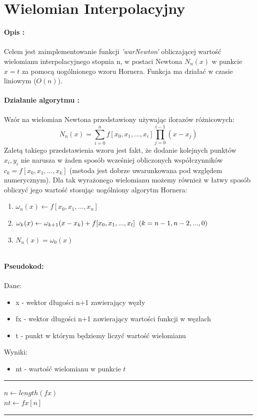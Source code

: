 \documentclass{article}
\begin{document}
\section*{Wielomian Interpolacyjny}
\noindent \textbf{Opis : }\\\\
Celem jest zaimplementowanie funkcji \textit{'warNewton'} obliczającej wartość wielomianu interpolacyjnego stopnia n, w postaci Newtona $N_n(x)$ w punkcie $x = t$ za pomocą uogólnionego wzoru Hornera. Funkcja ma działać w czasie liniowym ($O(n)$). \\\\
\noindent \textbf{Działanie algorytmu : }\\\\
Wzór na wielomian Newtona przedstawiony używając ilorazów różnicowych:
$$N_n(x) = \sum_{i=0}^{n}f[x_0,x_1,...,x_i]\prod_{j=0}^{i-1}(x-x_j)$$
Zaletą takiego przedstawienia wzoru jest fakt, że dodanie kolejnych punktów $x_i,y_i$ nie narusza w żaden sposób wcześniej obliczonych współczynników $c_k = f[x_0,x_1,...,x_k]$ (metoda jest dobrze uwarunkowana pod względem numerycznym). Dla tak wyrażonego wielomianu możemy również w łatwy sposób obliczyć jego wartość stosując uogólniony algorytm Hornera:
\begin{enumerate}
	\item $\omega_n(x) \gets f[x_0,x_1,...,x_n] $
	\item $\omega_k(x) \gets \omega_{k+1}(x-x_k)+f[x_0,x_1,...,x_l] \hspace{0.2cm} (k=n-1,n-2,...,0)$
	\item $N_n(x)= \omega_0(x)$\\\\
\end{enumerate}
\noindent \textbf{Pseudokod: } \\\\
Dane:
\begin{itemize}
	\item x - wektor długości n+1 zawierający węzły
	\item fx - wektor długości n+1 zawierający wartości funkcji w węzłach
	\item t - punkt w którym będziemy liczyć wartość wielomianu 
\end{itemize}
Wyniki:
\begin{itemize}
	\item nt - wartość wielomianu w punkcie $t$
\end{itemize}
\rule{\textwidth}{0.4pt}
\begin{algorithm}[H]
	\vspace{0.3cm}
	$n \gets length(fx)$\\
	$nt \gets fx[n]$\\
\end{algorithm}
\hrule
\vspace{0.3cm}
\end{document}
